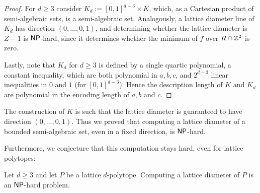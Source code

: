 \begin{proof}
For $d \geq 3$ consider $K_d:=[0,1]^{d-3} \times K$, which, as a Cartesian product of semi-algebraic sets, is a semi-algebraic set. Analogously, a lattice diameter line of $K_d$ has direction $(0,\ldots,0,1)$, and determining whether the lattice diameter is $Z-1$ is $\operatorname{\mathsf{NP}}$-hard, since it determines whether the minimum of $f$ over $R \cap \mathbb{Z}^2$ is zero.

Lastly, note that $K_d$ for $d \geq 3$ is defined by a single quartic polynomial, a constant inequality, which are both polynomial in $a,b,c$, and $2^{d-3}$ linear inequalities in $0$ and $1$ (for $[0,1]^{d-3}$). Hence the description length of $K$ and $K_d$ are polynomial in the encoding length of $a,b$ and $c$.
\end{proof}

\begin{remark}
    The construction of $K$ is such that the lattice diameter is guaranteed to have direction $(0, \ldots, 0,1)$. Thus we proved that computing a lattice diameter of a bounded semi-algebraic set, even in a fixed direction, is $\operatorname{\mathsf{NP}}$-hard.
\end{remark}

Furthermore, we conjecture that this computation stays hard, even for lattice polytopes:

\begin{conjecture}
    Let $d \geq 3$ and let $P$ be a lattice $d$-polytope. Computing a lattice diameter of $P$ is an $\operatorname{\mathsf{NP}}$-hard problem.
\end{conjecture}


    
